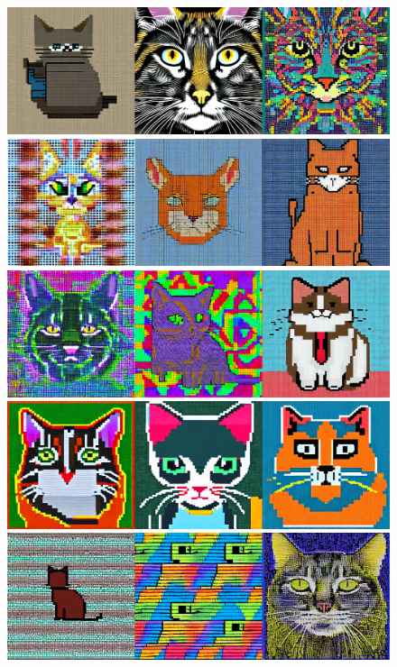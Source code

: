 \documentclass[extendedabs]{bmvc2k}
\begin{document}
\begin{figure}[t]
\centering
	\includegraphics[width=\linewidth]{images/cat0.png}
    \includegraphics[width=\linewidth]{images/cat100.png}
    \includegraphics[width=\linewidth]{images/cat200.png}
    \includegraphics[width=\linewidth]{images/cat300.png}
    \includegraphics[width=\linewidth]{images/cat400.png}

\end{figure}
\end{document}
